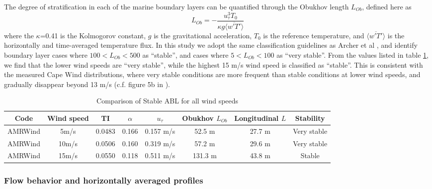 The degree of stratification in each of the marine boundary layers can
be quantified through the Obukhov length $L_{Ob}$, defined here as 
\begin{equation}
  L_{Ob} = -\frac{u_\tau^3 T_0}{\kappa g \langle \overline{w'T'} \rangle}
\end{equation}
where the $\kappa$=0.41 is the Kolmogorov constant, $g$ is the
gravitational acceleration, $T_0$ is the reference temperature, and
$\langle \overline{w'T'} \rangle$ is the horizontally and
time-averaged temperature flux.  In this study we adopt the same
classification guidelines as Archer et al
\cite{archer2016predominance}, and identify boundary layer cases where
$100 < L_{Ob} < 500$ as ``stable'', and cases where $5 < L_{Ob}<100$
as ``very stable''.  From the values listed in table
\ref{tab:CompareAMRallWS}, we find that the lower wind speeds are
``very stable'', while the highest 15 m/s wind speed is classified as
``stable''.  This is consistent with the measured Cape Wind
distributions, where very stable conditions are more frequent than
stable conditions at lower wind speeds, and gradually disappear beyond
13 m/s (c.f. figure 5b in \cite{archer2016predominance}).

\begin{table}
\caption{\label{tab:CompareAMRallWS} Comparison of Stable ABL for all
  wind speeds} \centering
\begin{tabular}{cccccccc}
  \hline
  Code & Wind speed   & TI     & $\alpha$& $u_\tau$ & Obukhov $L_{Ob}$ & Longitudinal $L$ & Stability \\
  \hline
  AMRWind & 5m/s      & 0.0483 &  0.166 &  0.157 m/s  &  52.5 m & 27.7 m  & Very stable\\
  AMRWind & 10m/s     & 0.0506 &  0.160 &  0.319 m/s  &  57.2 m & 29.6 m  & Very stable\\
  AMRWind & 15m/s     & 0.0550 &  0.118 &  0.511 m/s  & 131.3 m & 43.8 m  & Stable \\
  \hline
\end{tabular}
\end{table}

\subsubsection{Flow behavior and horizontally averaged profiles}

